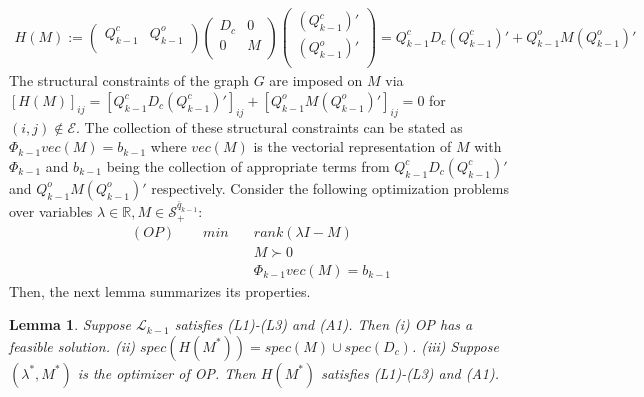 \documentclass[onecolumn,reviewcopy]{autart}
\def \L{\mathcal{L}}
\def \E{\mathcal{E}}
\def \S{\mathcal{S}}
\newtheorem{lemma}{Lemma}
\begin{document}
\begin{align} \label{eqn:HM}
H(M):= \left(
           \begin{array}{cc}
             Q_{k-1}^c & Q_{k-1}^o \\
           \end{array}
         \right) \left(\begin{array}{cc}
                  D_c & 0 \\
                  0 & M \\
                 \end{array}
                \right) \left(
                       \begin{array}{c}
                         (Q_{k-1}^c)' \\
                         (Q_{k-1}^o)' \\
                       \end{array}
                     \right)=Q_{k-1}^c D_c (Q_{k-1}^c)' + Q_{k-1}^o M(Q_{k-1}^o)'
\end{align}
The structural constraints of the graph $G$ are imposed on $M$ via $[H(M)]_{ij}=[Q_{k-1}^c D_c (Q_{k-1}^c)']_{ij}
+ [Q_{k-1}^o M(Q_{k-1}^o)']_{ij}=0$ for $(i,j) \notin \E$. The collection of these structural constraints can be stated as $\Phi_{k-1} vec(M) = b_{k-1}$ where $vec(M)$ is the vectorial representation of $M$ with $\Phi_{k-1}$ and $b_{k-1}$ being the collection of appropriate terms from $Q_{k-1}^c D_c (Q_{k-1}^c)'$ and  $Q_{k-1}^o M(Q_{k-1}^o)'$ respectively. Consider the following optimization problems over variables
$\lambda \in \mathbb{R}, M \in \S^{\bar{q}_{k-1}}_{+}$:
\begin{subequations}\label{eqn:M}
\begin{align}
(OP) \quad \quad min  \quad &rank(\lambda I - M) \label{eqn:minrank}\\
&M \succ 0 \label{eqn:Mpositive}\\
&\Phi_{k-1} vec(M) = b_{k-1} \label{eqn:Phi}
\end{align}
\end{subequations}
Then, the next lemma summarizes its properties.
\begin{lemma} \label{lem:prop1}
Suppose $\L_{k-1}$ satisfies (L1)-(L3) and (A1). Then
(i) OP has a feasible solution. (ii) $spec(H(M^*))=spec(M) \cup spec(D_c)$. (iii) Suppose $(\lambda^*, M^*)$ is the optimizer of OP. Then $H(M^*)$ satisfies (L1)-(L3) and (A1).

\end{lemma}
\end{document}
